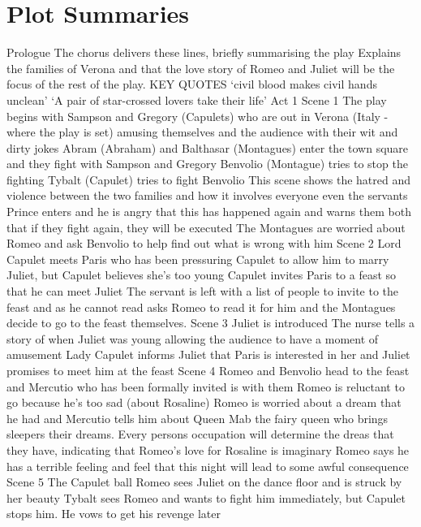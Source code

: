 \documentclass{article}
\begin{document}
\section{Plot Summaries}
\begin{outline}
\1 Prologue
\2 The chorus delivers these lines, briefly summarising the play
\2 Explains the families of Verona and that the love story of Romeo and Juliet will be the focus of the rest of the play.
\2 KEY QUOTES
\3 `civil blood makes civil hands unclean'
\3 `A pair of star-crossed lovers take their life'
\1 Act 1
\2 Scene 1
\3 The play begins with Sampson and Gregory (Capulets) who are out in Verona (Italy - where the play is set) amusing themselves and the audience with their wit and dirty jokes
\3 Abram (Abraham) and Balthasar (Montagues) enter the town square and they fight with Sampson and Gregory
\3 Benvolio (Montague) tries to stop the fighting
\3 Tybalt (Capulet) tries to fight Benvolio
\3 This scene shows the hatred and violence between the two families and how it involves everyone even the servants
\3 Prince enters and he is angry that this has happened again and warns them both that if they fight again, they will be executed
\3 The Montagues are worried about Romeo and ask Benvolio to help find out what is wrong with him
\2 Scene 2
\3 Lord Capulet meets Paris who has been pressuring Capulet to allow him to marry Juliet, but Capulet believes she's too young
\3 Capulet invites Paris to a feast so that he can meet Juliet
\3 The servant is left with a list of people to invite to the feast and as he cannot read asks Romeo to read it for him and the Montagues decide to go to the feast themselves.
\2 Scene 3
\3 Juliet is introduced
\3 The nurse tells a story of when Juliet was young allowing the audience to have a moment of amusement
\3 Lady Capulet informs Juliet that Paris is interested in her and Juliet promises to meet him at the feast
\2 Scene 4
\3 Romeo and Benvolio head to the feast and Mercutio who has been formally invited is with them
\3 Romeo is reluctant to go because he's too sad (about Rosaline)
\3 Romeo is worried about a dream that he had and Mercutio tells him about Queen Mab the fairy queen who brings sleepers their dreams. Every persons occupation will determine the dreas that they have, indicating that Romeo's love for Rosaline is imaginary
\3 Romeo says he has a terrible feeling and feel that this night will lead to some awful consequence
\2 Scene 5
\3 The Capulet ball
\3 Romeo sees Juliet on the dance floor and is struck by her beauty
\3 Tybalt sees Romeo and wants to fight him immediately, but Capulet stops him. He vows to get his revenge later

\end{outline}
\end{document}
